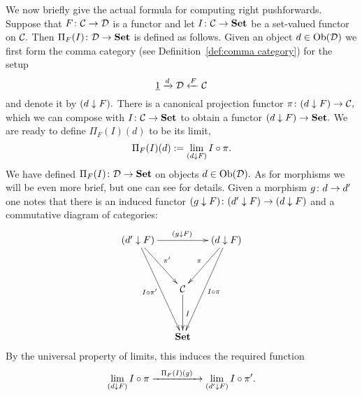\documentclass[CT4S-EN-RU]{subfiles}
\begin{document}
\begin{blockENG}
We now briefly give the actual formula for computing right pushforwards. Suppose that $F\colon\mathcal{C}\rightarrow\mathcal{D}$ is a functor and let $I\colon\mathcal{C}\rightarrow{\mathbf{Set}}$ be a set-valued functor on $\mathcal{C}.$ Then $\Pi_F(I)\colon\mathcal{D}\rightarrow{\mathbf{Set}}$ is defined as follows. Given an object $d\in\operatorname{Ob}(\mathcal{D})$ we first form the comma category (see Definition~\ref{def:comma category}) for the setup
$$\underline{1}\xrightarrow{d}\mathcal{D}\xleftarrow{F}\mathcal{C}$$
and denote it by $(d\downarrow F).$ There is a canonical projection functor $\pi\colon(d\downarrow F)\rightarrow\mathcal{C},$ which we can compose with $I\colon\mathcal{C}\rightarrow{\mathbf{Set}}$ to obtain a functor $(d\downarrow F)\rightarrow{\mathbf{Set}}.$ We are ready to define $\Pi_F(I)(d)$ to be its limit,
$$\Pi_F(I)(d):=\lim_{(d\downarrow F)}I\circ\pi.$$
We have defined $\Pi_F(I)\colon\mathcal{D}\rightarrow{\mathbf{Set}}$ on objects $d\in\operatorname{Ob}(\mathcal{D}).$ As for morphisms we will be even more brief, but one can see \cite{Sp1} for details. Given a morphism $g\colon d\rightarrow d'$ one notes that there is an induced functor $(g\downarrow F)\colon (d'\downarrow F)\rightarrow(d\downarrow F)$ and a commutative diagram of categories:
$$
\xymatrix@=15pt{
(d'\down F)\ar[rr]^{(g\down F)}\ar[ddr]^{\pi'}\ar[ddddr]_{I\circ\pi'}&&(d\down F)\ar[ddl]_{\pi}\ar[ddddl]^{I\circ\pi}\\\\
&\mcC\ar[dd]^I\\\\
&\Set
}
$$
By the universal property of limits, this induces the required function $$\lim_{(d\downarrow F)}I\circ\pi\xrightarrow{\ \ \Pi_F(I)(g)\ \ }\lim_{(d'\downarrow F)}I\circ\pi'.$$
\end{blockENG}

\begin{blockRUS}
\end{blockRUS}
\end{document}
